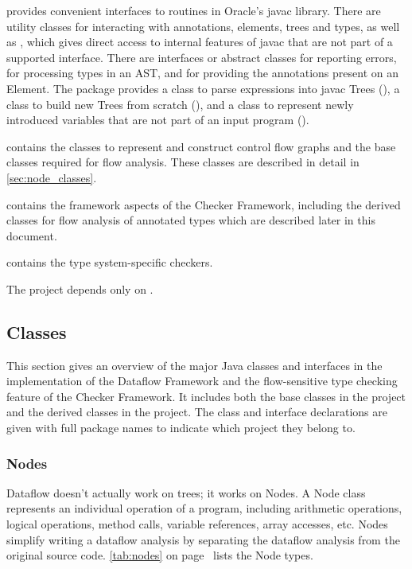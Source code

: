  provides convenient interfaces to routines in
Oracle's javac library.  There are utility classes for interacting
with annotations, elements, trees and types, as well as
, which gives direct access to internal features
of javac that are not part of a supported interface.  There are
interfaces or abstract classes for reporting errors, for processing
types in an AST, and for providing the annotations present on an
Element.
The  package provides a
class to parse expressions into javac Trees (), a
class to build new Trees from  scratch (), and a
class to represent newly introduced variables that are not part of an
input program ().

 contains the classes to represent and construct
control flow graphs and the base classes required for flow analysis.
These classes are described in detail in \autoref{sec:node_classes}.

 contains the framework aspects of the Checker
Framework, including the derived classes for flow analysis of
annotated types which are described later in this document.

 contains the type system-specific checkers.

The  project depends only on .


\subsection{Classes}

This section gives an overview of the major Java classes and
interfaces in the implementation of the Dataflow Framework and the
flow-sensitive type checking feature of the Checker Framework.  It
includes both the base classes in the  project and the
derived classes in the  project.  The class and
interface declarations are given with full package names to indicate
which project they belong to.

\subsubsection{Nodes}
\label{sec:node_classes}

Dataflow doesn't actually work on trees; it works on Nodes.
A Node class represents an individual operation of a program,
including arithmetic operations, logical operations, method calls,
variable references, array accesses, etc.
Nodes
simplify writing a dataflow analysis by separating the dataflow
analysis from the original source code.
\autoref{tab:nodes} on page~\pageref{tab:nodes} lists
the Node types.

